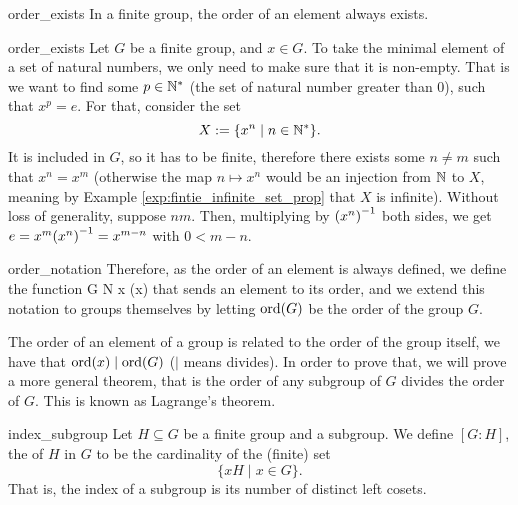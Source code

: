 \begin{clem}{}{order_exists}
    In a finite group, the order of an element always exists.
\end{clem}
\begin{lemproof}{order_exists}
    Let \( G \) be a finite group, and \( x \in G \). To take the minimal element of a set of natural numbers, we only need to make sure that it is non-empty. That is we want to find some \( p \in \mathbb{N}^* \) (the set of natural number greater than 0), such that \( x^p = e \). For that, consider the set 
    \begin{equation*}
        X := \{ x^n \mid n \in \mathbb{N}^* \}.
    \end{equation*}
    It is included in \( G \), so it has to be finite, therefore there exists some \( n \neq m \) such that \( x^n = x^m \) (otherwise the map \( n \mapsto x^n \) would be an injection from \( \mathbb{N} \) to \( X \), meaning by Example \ref{exp:fintie_infinite_set_prop} that \( X \) is infinite). Without loss of generality, suppose \( n  m \). Then, multiplying by \( {(x^n)}^{-1} \) both sides, we get \( e = x^m {(x^n)}^{-1} = x^{m-n} \) with \( 0 < m - n \). 
\end{lemproof}

\begin{crem}{}{order_notation}
    Therefore, as the order of an element is always defined, we define the function
    \fun \ord G {\bb N} x {\ord(x)}
    that sends an element to its order, and we extend this notation to groups themselves by letting \( \operatorname{ord}(G) \) be the order of the group \( G \).  
\end{crem}

The order of an element of a group is related to the order of the group itself, we have that \( \operatorname{ord}(x) \mid \operatorname{ord}(G) \) (\( \mid \) means divides). In order to prove that, we will prove a more general theorem, that is the order of any subgroup of \( G \) divides the order of \( G \). This is known as Lagrange's theorem.

\begin{cdef}{}{index_subgroup}
    Let \( H \subseteq G \) be a finite group and a subgroup. We define \( [G : H] \), the  of \( H \) in \( G \) to be the cardinality of the (finite) set 
    \begin{equation*}
        \{ x H \mid x \in G \}.
    \end{equation*}
    That is, the index of a subgroup is its number of distinct left cosets.  
\end{cdef}

